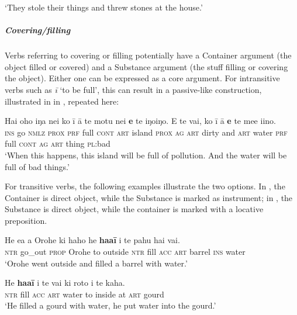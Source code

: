 \glt
‘They stole their things and threw stones at the house.’ \textstyleExampleref{[R231.278]} 
\z

\subparagraph{Covering/filling} Verbs referring to covering or filling potentially have a Container argument (the object filled or covered) and a Substance argument (the stuff filling or covering the object). Either one can be expressed as a core argument. For intransitive verbs such as \textit{{\ꞌ}ī} ‘to be full’, this can result in a passive-like construction, illustrated in  in , repeated here:

\ea\label{ex:8.65a}
\gll Hai oho iŋa nei ko {\ꞌ}ī {\ꞌ}ā te motu nei \textbf{e} te iŋoiŋo. {\ꞌ}E te vai, ko {\ꞌ}ī {\ꞌ}ā \textbf{e} te me{\ꞌ}e {\ꞌ}i{\ꞌ}ino. \\
\textsc{ins} go \textsc{nmlz} \textsc{prox} \textsc{prf} full \textsc{cont} \textsc{art} island \textsc{prox} \textsc{ag} \textsc{art} dirty and \textsc{art} water \textsc{prf} full \textsc{cont} \textsc{ag} \textsc{art} thing \textsc{pl}:bad \\

\glt
‘When this happens, this island will be full of pollution. And the water will be full of bad things.’ \textstyleExampleref{[R649.119]} 
\z

For transitive verbs, the following examples illustrate the two options. In , the Container is direct object, while the Substance is marked as instrument; in , the Substance is direct object, while the container is marked with a locative preposition. 

\ea\label{ex:8.138}
\gll He e{\ꞌ}a a {\ꞌ}Orohe ki haho he \textbf{ha{\ꞌ}a{\ꞌ}ī} i te pahu hai vai. \\
\textsc{ntr} go\_out \textsc{prop} Orohe to outside \textsc{ntr} fill \textsc{acc} \textsc{art} barrel \textsc{ins} water \\

\glt 
‘Orohe went outside and filled a barrel with water.’ \textstyleExampleref{[R169.002]} 
\z

\ea\label{ex:8.139}
\gll He \textbf{ha{\ꞌ}a{\ꞌ}ī} i te vai ki roto i te kaha. \\
\textsc{ntr} fill \textsc{acc} \textsc{art} water to inside at \textsc{art} gourd \\

\glt 
‘He filled a gourd with water, he put water into the gourd.’ \textstyleExampleref{[Fel-97.035]}\textstyleExampleref{} 
\z

